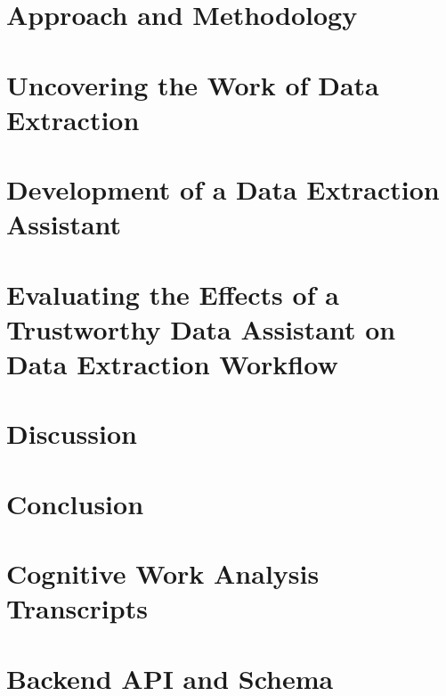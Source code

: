 \documentclass[11pt,a4paper,oneside]{report}
\begin{document}
\chapter{Approach and Methodology}


\chapter{Uncovering the Work of Data Extraction}\label{ch:uncovering-work}


\chapter{Development of a Data Extraction Assistant}\label{ch:development}


\chapter{Evaluating the Effects of a Trustworthy Data Assistant on Data Extraction Workflow}


\chapter{Discussion}


\chapter{Conclusion}


\printbibliography[title={References}]

\appendix

\chapter{Cognitive Work Analysis Transcripts}


\chapter{Backend API and Schema}\label{apdx:api-schema}

\end{document}
